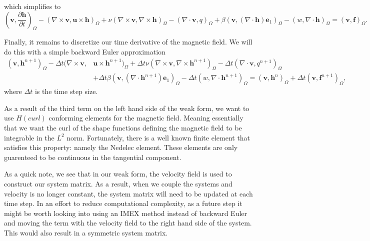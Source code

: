 \documentclass{article}
\begin{document}
        which simplifies to
        \[
            \left(\boldsymbol{v},\frac{\partial \boldsymbol{h} }{\partial t}\right)_\Omega
            -\left(\nabla \times \boldsymbol{v},\boldsymbol{u}\times \boldsymbol{h}\right)_\Omega
            + \nu\left(\nabla \times\boldsymbol{v},\nabla \times \boldsymbol{h}\right)_\Omega
            - \left(\nabla \cdot \boldsymbol{v},q\right)_\Omega
            + \beta\left(\boldsymbol{v}, (\nabla \cdot \boldsymbol{h})\boldsymbol{e}_1\right)_\Omega
            -\left(w,\nabla  \cdot \boldsymbol{h}\right)_\Omega = (\boldsymbol{v},\boldsymbol{f})_\Omega.
        \]

        Finally, it remains to discretize our time derivative of the magnetic field. We will do this with a simple backward Euler approximation
        \begin{align*}
            \left(\boldsymbol{v},\boldsymbol{h}^{n+1} \right)_\Omega
            -\Delta t (\nabla \times   \boldsymbol{v},&\boldsymbol{u}\times \boldsymbol{h}^{n+1})_\Omega
            +\Delta t \nu\left(\nabla \times\boldsymbol{v},\nabla \times \boldsymbol{h}^{n+1}\right)_\Omega
            - \Delta t \left(\nabla \cdot \boldsymbol{v},q^{n+1}\right)_\Omega \\
            &+ \Delta t \beta\left(\boldsymbol{v}, (\nabla \cdot \boldsymbol{h}^{n+1})\boldsymbol{e}_1\right)_\Omega
            -\Delta t\left(w,\nabla  \cdot \boldsymbol{h}^{n+1}\right)_\Omega = \left(\boldsymbol{v},\boldsymbol{h}^{n}\right)_\Omega +\Delta t (\boldsymbol{v},\boldsymbol{f}^{n+1})_\Omega,
        \end{align*}
        where $\Delta t$ is the time step size.


        As a result of the third term on the left hand side of the weak form, we want to use $H(curl)$ conforming elements for the magnetic field. Meaning essentially that we want the curl of the shape functions defining the magnetic field to be integrable in the $L^2$ norm. Fortunately, there is a well known finite element that satisfies this property: namely the Nedelec element. These elements are only guarenteed to be continuous in the tangential component. 

        As a quick note, we see that in our weak form, the velocity field is used to construct our system matrix. As a result, when we couple the systems and velocity is no longer constant, the system matrix will need to be updated at each time step. In an effort to reduce computational complexity, as a future step it might be worth looking into using an IMEX method instead of backward Euler and moving the term with the velocity field to the right hand side of the system. This would also result in a symmetric system matrix.
\end{document}
